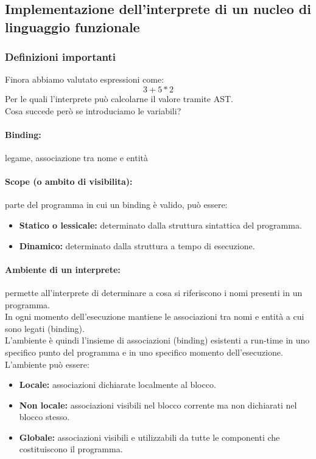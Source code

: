 \documentclass[12pt,a4paper]{article}
\begin{document}
\subsection{Implementazione dell'interprete di un nucleo di linguaggio funzionale}
\subsubsection{Definizioni importanti}
Finora abbiamo valutato espressioni come:
\[
3 + 5 * 2
\]
Per le quali l'interprete può calcolarne il valore tramite AST.\\
Cosa succede però se introduciamo le variabili?
\paragraph{Binding:} legame, associazione tra nome e entità
\paragraph{Scope (o ambito di visibilita):} parte del programma in cui un binding è valido, può essere:
\begin{itemize}
  \item \textbf{Statico o lessicale:} determinato dalla struttura sintattica del programma.
  \item \textbf{Dinamico:} determinato dalla struttura a tempo di esecuzione.
\end{itemize}
\paragraph{Ambiente di un interprete:} permette all'interprete di determinare a cosa si riferiscono i nomi presenti in un programma.\\
In ogni momento dell'esecuzione mantiene le associazioni tra 
nomi e entità a cui sono legati (binding).\\
L'ambiente è quindi l'insieme di associazioni (binding) esistenti a run-time in uno specifico punto del programma e in uno specifico momento dell'esecuzione.\\
L'ambiente può essere:
\begin{itemize}
  \item \textbf{Locale:} associazioni dichiarate localmente al blocco.
  \item \textbf{Non locale:} associazioni visibili nel blocco corrente ma non dichiarati nel blocco stesso.
  \item \textbf{Globale:} associazioni visibili e utilizzabili da tutte le componenti che costituiscono il programma.
\end{itemize}
\end{document}
